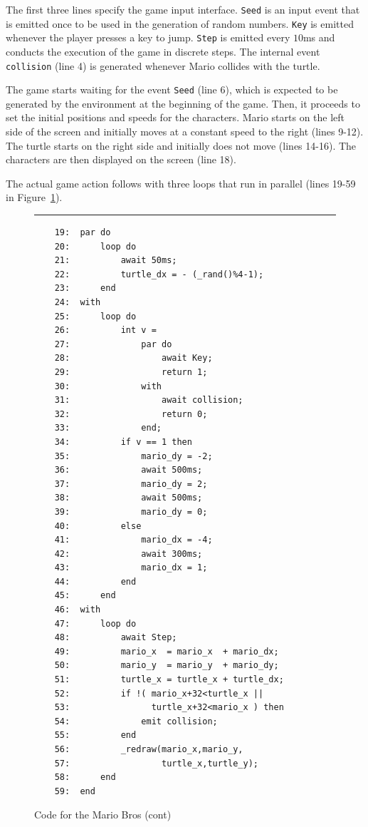 \documentclass[11pt,a4paper]{article}
\newcommand{\2}{\;\;}
\newcommand{\5}{\;\;\;\;\;}
\newcommand{\code}[1] {{\small{\texttt{#1}}}}
\begin{document}
The first three lines specify the game input interface.
\code{Seed} is an input event that is emitted once to be used in the generation 
of random numbers.
\code{Key} is emitted whenever the player presses a key to jump.
\code{Step} is emitted every $10$ms and conducts the execution of the game in 
discrete steps.
The internal event \code{collision} (line 4) is generated whenever Mario 
collides with the turtle.

The game starts waiting for the event \code{Seed} (line 6), which is expected 
to be generated by the environment at the beginning of the game.
Then, it proceeds to set the initial positions and speeds for the characters.
Mario starts on the left side of the screen and initially moves at a constant 
speed to the right (lines 9-12).
The turtle starts on the right side and initially does not move (lines 14-16).
The characters are then displayed on the screen (line 18).

The actual game action follows with three loops that run in parallel (lines 
19-59 in Figure~\ref{lst:demos:mario:2}).

\begin{figure}[!]
\rule{15cm}{0.37pt}
{\small
\begin{verbatim}
    19:  par do
    20:      loop do
    21:          await 50ms;
    22:          turtle_dx = - (_rand()%4-1);
    23:      end
    24:  with
    25:      loop do
    26:          int v =
    27:              par do
    28:                  await Key;
    29:                  return 1;
    30:              with
    31:                  await collision;
    32:                  return 0;
    33:              end;
    34:          if v == 1 then
    35:              mario_dy = -2;
    36:              await 500ms;
    37:              mario_dy = 2;
    38:              await 500ms;
    39:              mario_dy = 0;
    40:          else
    41:              mario_dx = -4;
    42:              await 300ms;
    43:              mario_dx = 1;
    44:          end
    45:      end
    46:  with
    47:      loop do
    48:          await Step;
    49:          mario_x  = mario_x  + mario_dx;
    50:          mario_y  = mario_y  + mario_dy;
    51:          turtle_x = turtle_x + turtle_dx;
    52:          if !( mario_x+32<turtle_x ||
    53:                turtle_x+32<mario_x ) then
    54:              emit collision;
    55:          end
    56:          _redraw(mario_x,mario_y,
    57:                  turtle_x,turtle_y);
    58:      end
    59:  end
\end{verbatim}
}
\caption{ Code for the Mario Bros (cont)
\label{lst:demos:mario:2}
}
\end{figure}
\end{document}
